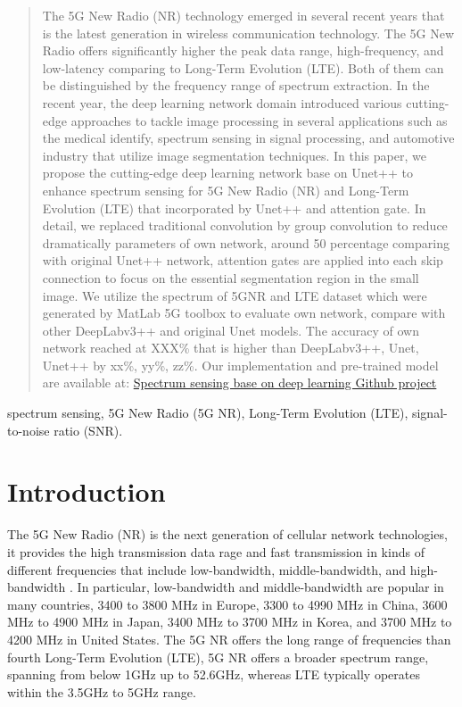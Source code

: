 \documentclass[journal]{IEEEtran} %
\begin{document}
\begin{abstract}
    The 5G New Radio (NR) technology emerged in several recent years that  is the latest generation in wireless communication technology. The 5G New Radio offers significantly higher the peak data range, high-frequency, and low-latency comparing to Long-Term Evolution (LTE). Both of them can be distinguished by the frequency range of spectrum extraction. In the recent year, the deep learning network domain introduced various cutting-edge approaches to tackle image processing in several applications such as the medical identify, spectrum sensing in signal processing, and automotive industry that utilize image segmentation techniques. In this paper, we propose the cutting-edge deep learning network base on Unet++ to enhance spectrum sensing for 5G New Radio (NR) and Long-Term Evolution (LTE) that incorporated by Unet++ and attention gate. In detail, we replaced traditional convolution by group convolution to reduce dramatically parameters of own network, around 50 percentage comparing with original Unet++ network, attention gates are applied into each skip connection to focus on the essential segmentation region in the small image. We utilize the spectrum of 5GNR and LTE dataset which were generated by MatLab 5G toolbox to evaluate own network, compare with other DeepLabv3++ and original Unet models. The accuracy of own network reached at XXX\% that is higher than DeepLabv3++, Unet, Unet++ by xx\%, yy\%, zz\%. Our implementation and pre-trained model are available at:
    \href{https://github.com/Winxkin/Spectrum_sensing_base_on_Deep_learning.git}{Spectrum sensing base on deep learning Github project}
\end{abstract}

\begin{IEEEkeywords}
    spectrum sensing, 5G New Radio (5G NR), Long-Term Evolution (LTE), signal-to-noise ratio (SNR).
\end{IEEEkeywords}

\section{Introduction}
The 5G New Radio (NR) is the next generation of cellular network technologies, it provides the high transmission data rage and fast transmission in kinds of different frequencies that include low-bandwidth, middle-bandwidth, and high-bandwidth \cite{b7}. In particular, low-bandwidth and middle-bandwidth are popular in many countries, 3400 to 3800 MHz in Europe, 3300 to 4990 MHz in China, 3600 MHz to 4900 MHz in Japan, 3400 MHz to 3700 MHz in Korea, and 3700 MHz to 4200 MHz in United States. The 5G NR offers the long range of frequencies than fourth Long-Term Evolution (LTE), 5G NR offers a broader spectrum range, spanning from below 1GHz up to 52.6GHz, whereas LTE typically operates within the 3.5GHz to 5GHz range.
\end{document}
